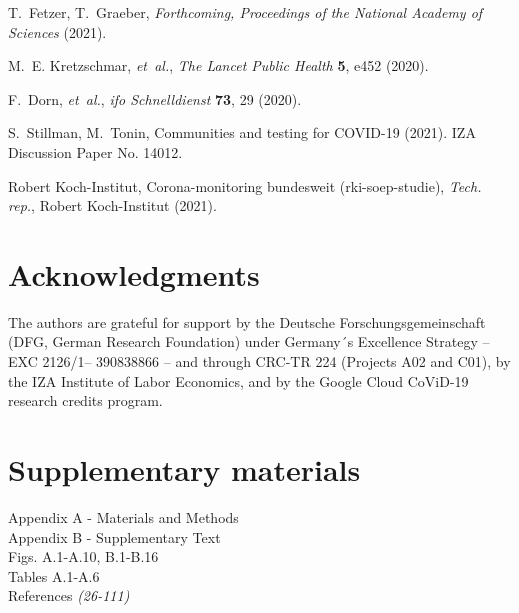 \documentclass[12pt]{article}
\begin{document}
\begin{thebibliography}{10}
T.~Fetzer, T.~Graeber, {\it Forthcoming, Proceedings of the National Academy of
  Sciences\/}  (2021).

M.~E. Kretzschmar, {\it et~al.\/}, {\it The Lancet Public Health\/} {\bf 5},
  e452 (2020).

F.~Dorn, {\it et~al.\/}, {\it ifo Schnelldienst\/} {\bf 73}, 29 (2020).

S.~Stillman, M.~Tonin, Communities and testing for {COVID-19} (2021). IZA
  Discussion Paper No. 14012.

{Robert Koch-Institut}, Corona-monitoring bundesweit (rki-soep-studie), {\it
  Tech. rep.\/}, {Robert Koch-Institut} (2021).

\end{thebibliography}


\section*{Acknowledgments}

The authors are grateful for support by the Deutsche Forschungsgemeinschaft (DFG, German
Research Foundation) under Germany´s Excellence Strategy – EXC 2126/1– 390838866 – and
through CRC-TR 224 (Projects A02 and C01), by the IZA Institute of Labor Economics, and
by the Google Cloud CoViD-19 research credits program.



\section*{Supplementary materials}

Appendix A - Materials and Methods\\
Appendix B - Supplementary Text\\
Figs. A.1-A.10, B.1-B.16\\
Tables A.1-A.6\\
References \textit{(26-111)}
\end{document}
